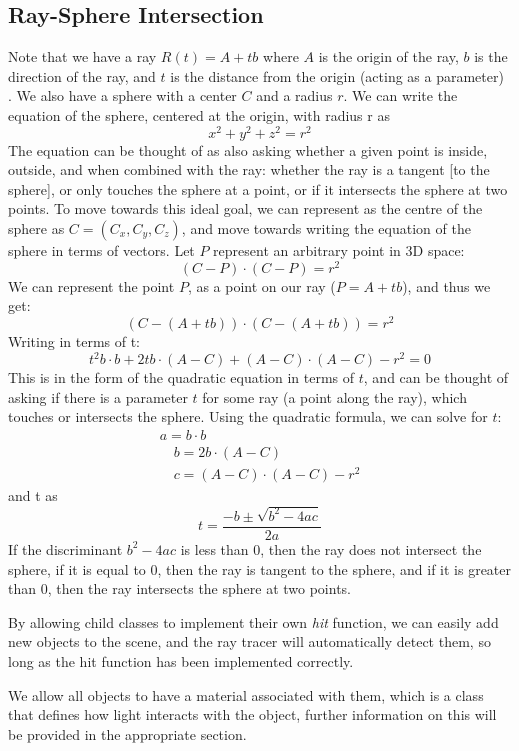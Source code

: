 \documentclass[../main.tex]{subfiles}
\begin{document}
\subsection{Ray-Sphere Intersection}
Note that we have a ray $R(t) = A + tb$ where $A$ is the origin of the ray, $b$ is the direction of the ray, and $t$ is the distance from the origin (acting as a parameter) \cite{ap_professional_firm_ap_1995}.
We also have a sphere with a center $C$ and a radius $r$.
We can write the equation of the sphere, centered at the origin, with radius r as
$$
x^2 + y^2 + z^2 = r^2
$$
The equation can be thought of as also asking whether a given point is inside, outside, and when combined with the ray: whether the ray is a tangent [to the sphere], or only touches
the sphere at a point, or if it intersects the sphere at two points.
To move towards this ideal goal, we can represent as the centre of the sphere as $C = (C_x, C_y, C_z)$, and move towards writing the equation of the sphere in terms of vectors.
Let $P$ represent an arbitrary point in 3D space:
$$
(C-P) \cdot (C-P) = r^2
$$
We can represent the point $P$, as a point on our ray ($P = A + tb$), and thus we get:
$$
(C - (A + tb)) \cdot (C - (A + tb)) = r^2
$$
Writing in terms of t:
$$
t^2b \cdot b + 2t b \cdot (A - C) + (A - C) \cdot (A - C) - r^2 = 0
$$
This is in the form of the quadratic equation in terms of $t$, and can be thought of asking if there is a parameter $t$ for some ray (a point along the ray), which touches or intersects the sphere.
Using the quadratic formula, we can solve for $t$:
\begin{gather*}
a = b \cdot b \\ \quad b = 2b \cdot (A - C) \\ \quad c = (A - C) \cdot (A - C) - r^2
\end{gather*}
and t as 
$$
t = \frac{-b \pm \sqrt{b^2 - 4ac}}{2a}
$$
If the discriminant $b^2 - 4ac$ is less than 0, then the ray does not intersect the sphere,
if it is equal to 0, then the ray is tangent to the sphere, and if it is greater than 0, then the ray intersects the sphere at two points.

By allowing child classes to implement their own \textit{hit} function, we can easily add new objects to the scene, and the ray tracer will automatically detect them,
so long as the hit function has been implemented correctly.

We allow all objects to have a material associated with them, which is a class that defines how light interacts with the object, further 
information on this will be provided in the appropriate section.
\end{document}
